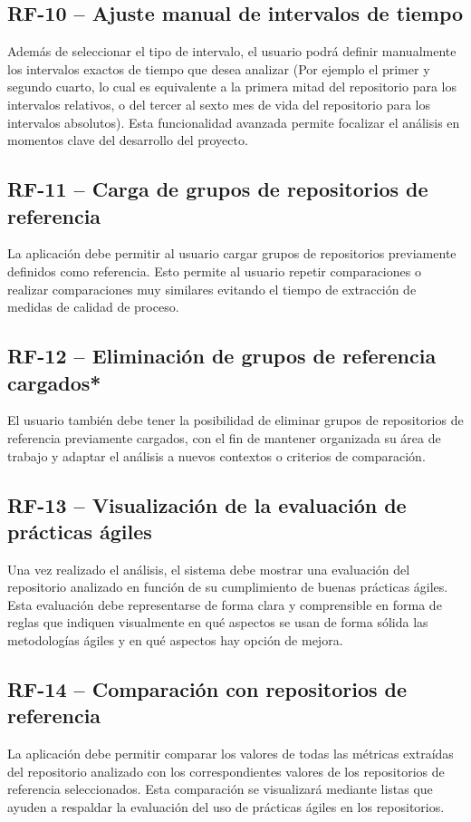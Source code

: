 \subsection*{RF-10 – Ajuste manual de intervalos de tiempo}
Además de seleccionar el tipo de intervalo, el usuario podrá definir manualmente los intervalos exactos de tiempo que desea analizar (Por ejemplo el primer y segundo cuarto, lo cual es equivalente a la primera mitad del repositorio para los intervalos relativos, o del tercer al sexto mes de vida del repositorio para los intervalos absolutos). Esta funcionalidad avanzada permite focalizar el análisis en momentos clave del desarrollo del proyecto.

\subsection*{RF-11 – Carga de grupos de repositorios de referencia}
La aplicación debe permitir al usuario cargar grupos de repositorios previamente definidos como referencia. Esto permite al usuario repetir comparaciones o realizar comparaciones muy similares evitando el tiempo de extracción de medidas de calidad de proceso.

\subsection*{RF-12 – Eliminación de grupos de referencia cargados*}
El usuario también debe tener la posibilidad de eliminar grupos de repositorios de referencia previamente cargados, con el fin de mantener organizada su área de trabajo y adaptar el análisis a nuevos contextos o criterios de comparación.

\subsection*{RF-13 – Visualización de la evaluación de prácticas ágiles}
Una vez realizado el análisis, el sistema debe mostrar una evaluación del repositorio analizado en función de su cumplimiento de buenas prácticas ágiles. Esta evaluación debe representarse de forma clara y comprensible en forma de reglas que indiquen visualmente en qué aspectos se usan de forma sólida las metodologías ágiles y en qué aspectos hay opción de mejora.

\subsection*{RF-14 – Comparación con repositorios de referencia}
La aplicación debe permitir comparar los valores de todas las métricas extraídas del repositorio analizado con los correspondientes valores de los repositorios de referencia seleccionados. Esta comparación se visualizará mediante listas que ayuden a respaldar la evaluación del uso de prácticas ágiles en los repositorios.


